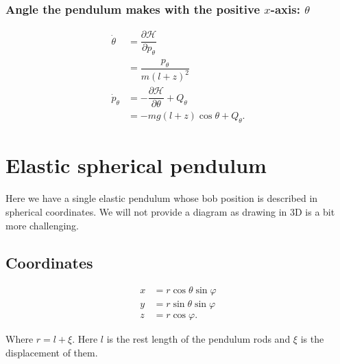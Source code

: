 \documentclass[12pt,a4paper,portrait]{article}
\newcommand{\ham}{\mathcal{H}}
\begin{document}
\subsubsection{Angle the pendulum makes with the positive $x$-axis: $\theta$}
\begin{align*}
	\dot{\theta} &= \dfrac{\partial \ham}{\partial p_{\theta}} \\
	&= \dfrac{p_{\theta}}{m(l+z)^2} \\
	\dot{p}_{\theta} &= -\dfrac{\partial \ham}{\partial \theta} + Q_{\theta} \\
	&= -mg(l+z)\cos{\theta} + Q_{\theta}.
\end{align*}

\section{Elastic spherical pendulum}
Here we have a single elastic pendulum whose bob position is described in spherical coordinates. We will not provide a diagram as drawing in 3D is a bit more challenging.

\subsection{Coordinates}
\begin{align*}
	x &= r\cos{\theta}\sin{\varphi}\\
	y &= r\sin{\theta}\sin{\varphi} \\
	z &= r\cos{\varphi}.
\end{align*}

Where $r = l + \xi$. Here $l$ is the rest length of the pendulum rods and $\xi$ is the displacement of them. 
\end{document}
